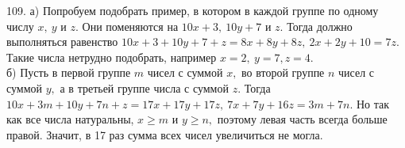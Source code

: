 109. а) Попробуем подобрать пример, в котором в каждой группе по одному числу $x,\ y$ и $z.$ Они поменяются на $10x+3,\ 10y+7$ и $z.$ Тогда должно выполняться равенство $10x+3+10y+7+z=8x+8y+8z,\ 2x+2y+10=7z.$ Такие числа нетрудно подобрать, например $x=2,\ y=7, z=4.$\\
б) Пусть в первой группе $m$ чисел с суммой $x,$ во второй группе $n$ чисел с суммой $y,$ а в третьей группе числа с суммой $z.$ Тогда
$10x+3m+10y+7n+z=17x+17y+17z,\ 7x+7y+16z=3m+7n.$ Но так как все числа натуральны, $x\geqslant m$ и $y\geqslant n,$ поэтому левая часть всегда больше правой. Значит, в 17 раз сумма всех чисел увеличиться не могла.\\
